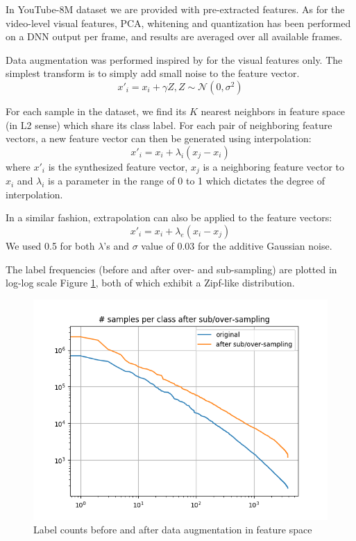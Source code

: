 \documentclass[runningheads]{llncs}
\begin{document}
In YouTube-8M dataset we are provided with pre-extracted features.
As for the video-level visual features, PCA, whitening and quantization has been performed on a DNN output per frame, and results are averaged over all available frames.

Data augmentation was performed inspired by \cite{devries2017} for the visual features only.
The simplest transform is to simply add small noise to the feature vector.
\begin{equation}
x'_i = x_i + \gamma Z, Z \sim \mathcal{N}(0, \sigma^2)
\end{equation}

For each sample in the dataset, we find its $K$ nearest neighbors in feature space (in L2 sense) which share its class label.
For each pair of neighboring feature vectors, a new feature vector can then be generated using interpolation:
\begin{equation}
x'_i = x_i + \lambda_i (x_j - x_i)
\end{equation}
where $x'_i$ is the synthesized feature vector, $x_j$ is a neighboring feature vector to $x_i$ and $\lambda_i$ is a parameter in the range of 0 to 1 which dictates the degree of interpolation.

In a similar fashion, extrapolation can also be applied to the feature vectors:
\begin{equation}
x'_i = x_i + \lambda_e (x_i - x_j)
\end{equation}
We used 0.5 for both $\lambda$'s and $\sigma$ value of 0.03 for the additive Gaussian noise.

The label frequencies (before and after over- and sub-sampling) are plotted in log-log scale Figure \ref{fig:numsamples}, both of which exhibit a Zipf-like distribution.
\begin{figure}
  \includegraphics[width=\linewidth]{./figures/new_num_samples_per_class.png}
  \caption{Label counts before and after data augmentation in feature space}
  \label{fig:numsamples}
\end{figure}
\end{document}
